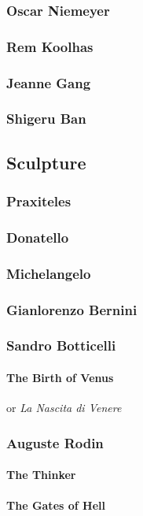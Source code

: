 			\subsubsection{Oscar Niemeyer}
			\subsubsection{Rem Koolhas}
			\subsubsection{Jeanne Gang}
			\subsubsection{Shigeru Ban}
		\newpage	
		\subsection{Sculpture}
			\subsubsection{Praxiteles}
			\subsubsection{Donatello}
			\subsubsection{Michelangelo}
			\subsubsection{Gianlorenzo Bernini}
			\subsubsection{Sandro Botticelli}
				\paragraph{The Birth of Venus} or \textit{La Nascita di Venere}
			\subsubsection{Auguste Rodin}
				\paragraph{The Thinker}
				\paragraph{The Gates of Hell}
